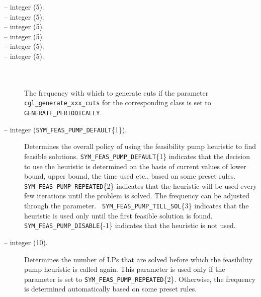 \begin{description}
\item[ -- integer (5).] 
\item[ -- integer (5).] 
\item[ -- integer (5).] 
\item[ -- integer (5).] 
\item[ -- integer (5).] 
\item[ -- integer (5).] 
\ \\ \ \\
The frequency with which to generate cuts if the
parameter \texttt{cgl\_generate\_xxx\_cuts} for the
corresponding class is set to \texttt{GENERATE\_PERIODICALLY}.

\label{fp_enabled}
\item[ -- integer ({\tt SYM\_FEAS\_PUMP\_DEFAULT}\{1\}).] 
Determines the overall policy of using the feasibility pump heuristic to find
feasible solutions. {\tt SYM\_FEAS\_PUMP\_DEFAULT}\{1\} indicates that the
decision to use the heuristic is determined on the basis of current values of
lower bound, upper bound, the time used etc., based on some preset rules. {\tt
SYM\_FEAS\_PUMP\_REPEATED}\{2\} indicates that the heuristic will be used
every few iterations until the problem is solved. The frequency can be
adjusted through the  parameter.  {\tt
SYM\_FEAS\_PUMP\_TILL\_SOL}\{3\} indicates that the heuristic is used only
until the first feasible solution is found. {\tt
SYM\_FEAS\_PUMP\_DISABLE}\{-1\} indicates that the heuristic is not used.

\item[ -- integer (10).] 
Determines the number of LPs that are solved before which the feasibility pump
heuristic is called again. This parameter is used only if the parameter
 is set to {\tt SYM\_FEAS\_PUMP\_REPEATED}\{2\}. Otherwise,
the frequency is determined automatically based on some preset rules. 


\end{description}
